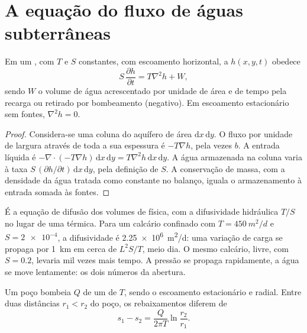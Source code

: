 \section{A equação do fluxo de águas subterrâneas}\label{sec:b3:hydrogeology:flow-equation}

\begin{theorem}\label{thm:b3:hydrogeology:flow-equation}
Em um , com  $T$ e  $S$ constantes,
com escoamento horizontal, a  $h(x, y, t)$ obedece
\[
S\,\frac{\partial h}{\partial t} = T\nabla^2h + W ,
\]
sendo $W$ o volume de água acrescentado por unidade de área e de tempo pela recarga ou
retirado por bombeamento (negativo). Em escoamento estacionário sem fontes, $\nabla^2h =
0$.
\end{theorem}

\begin{proof}
Considera-se uma coluna do aquífero de área $\mathrm dx\,\mathrm dy$. O fluxo por
unidade de largura através de toda a sua espessura é $-T\nabla h$, pela 
vezes $b$. A entrada líquida é $-\nabla\cdot(-T\nabla h)\,\mathrm dx\,\mathrm
dy = T\nabla^2h\,\mathrm dx\,\mathrm dy$. A água armazenada na coluna
varia à taxa $S\,(\partial h/\partial t)\,\mathrm dx\,\mathrm dy$,
pela definição de $S$. A conservação de massa, com a densidade da água
tratada como constante no balanço, iguala o armazenamento à entrada somada às fontes.
\end{proof}

É a equação de difusão dos volumes de física, com a difusividade
hidráulica $T/S$ no lugar de uma térmica. Para um calcário confinado com
$T = \qty{450}{m^2/d}$ e $S = \num{2e-4}$, a difusividade é
\qty{2.25e6}{m^2/d}: uma variação de carga se propaga por \qty{1}{km} em
cerca de $L^2S/T$, meio dia. O mesmo calcário, livre, com $S =
0.2$, levaria mil vezes mais tempo. A pressão se propaga rapidamente, a
água se move lentamente: os dois números da abertura.

\begin{proposition}\label{prop:b3:hydrogeology:thiem}
Um poço bombeia $Q$ de um  de  $T$, sendo o
escoamento estacionário e radial. Entre duas distâncias $r_1 < r_2$ do poço, os
rebaixamentos diferem de
\[
s_1 - s_2 = \frac{Q}{2\pi T}\ln\frac{r_2}{r_1} .
\]
\end{proposition}

